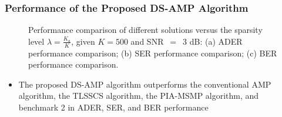 \documentclass[9pt]{beamer}
\begin{document}
\begin{frame}
\frametitle{Performance of the Proposed DS-AMP Algorithm}
\begin{figure}[h]
\centering
{}%
%
%
\centering
\setlength{\abovecaptionskip}{-1mm}
\caption{Performance comparison of different solutions versus the sparsity level $\lambda=\frac{K_a}{K}$, given $K=500$ and SNR~$=$~3 dB: (a) ADER performance comparison; (b) SER performance comparison; (c) BER performance comparison. }
\label{fig:SNR}
\vspace{-5mm}
\end{figure}
\begin{itemize}
\item
The proposed DS-AMP algorithm outperforms the conventional AMP algorithm, the TLSSCS algorithm, the PIA-MSMP algorithm, and benchmark 2 in ADER, SER, and BER performance
\end{itemize}
\end{frame}
\end{document}
